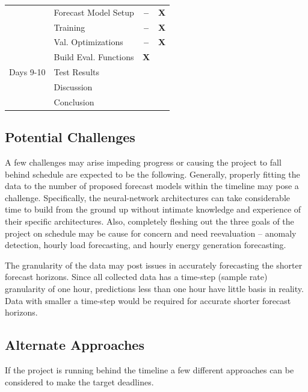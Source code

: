 \documentclass[sigconf]{acmart}
\begin{document}
\begin{table}[hbt!]
\begin{tabular}{ll | c | c}
   \cmidrule(rl){1-4} 
   & Forecast Model Setup &\textbf{--} & \textbf{X}\\  
   \cmidrule(rl){2-4} 
   & \hspace{3mm}Training &\textbf{--} & \textbf{X} \\  
   & \hspace{3mm}Val. Optimizations &\textbf{--} & \textbf{X}\\  
   & Build Eval. Functions & \textbf{X}& \\  
   \cmidrule(rl){2-4} 
  Days 9-10 & Test Results & & \\  
  \cmidrule(rl){1-4} 
   & Discussion & & \\
   \cmidrule(rl){2-4}   
   & Conclusion & & \\  
   \cmidrule(rl){2-4} 
  \bottomrule
\end{tabular}
\end{table}

\subsection{Potential Challenges}
A few challenges may arise impeding progress or causing the project to fall behind schedule are expected to be the following. 
Generally, properly fitting the data to the number of proposed forecast models within the timeline may pose a challenge. Specifically, the neural-network architectures can take considerable time to build from the ground up without intimate knowledge and experience of their specific architectures. Also, completely fleshing out the three goals of the project on schedule may be cause for concern and need reevaluation -- anomaly detection, hourly load forecasting, and hourly energy generation forecasting.

The granularity of the data may post issues in accurately forecasting the shorter forecast horizons. Since all collected data has a time-step (sample rate) granularity of one hour, predictions less than one hour have little basis in reality. Data with smaller a time-step would be required for accurate shorter forecast horizons.

\subsection{Alternate Approaches}
If the project is running behind the timeline a few different approaches can be considered to make the target deadlines. 
\end{document}
